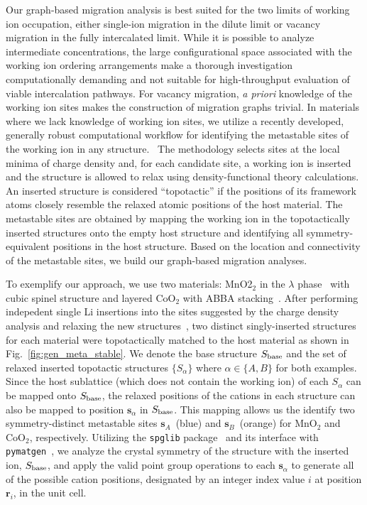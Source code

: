 \documentclass[reprint,preprintnumbers,amsmath,amssymb,aps,prl]{revtex4-1}
\begin{document}
Our graph-based migration analysis is best suited for the two limits of working ion occupation, either single-ion migration in the dilute limit or vacancy migration in the fully intercalated limit.
While it is possible to analyze intermediate concentrations, the large configurational space associated with the working ion ordering arrangements make a thorough investigation computationally demanding and not suitable for high-throughput evaluation of viable intercalation pathways.
For vacancy migration, {\it a priori} knowledge of the working ion sites makes the construction of migration graphs trivial.
In materials where we lack knowledge of working ion sites, we utilize a recently developed, generally robust computational workflow for identifying the metastable sites of the working ion in any structure.~\cite{Shen2020Oct} 
The methodology selects sites at the local minima of charge density and, for each candidate site, a working ion is inserted and the structure is allowed to relax using density-functional theory calculations. An inserted structure is considered ``topotactic'' if the positions of its framework atoms closely resemble the relaxed atomic positions of the host material.
The metastable sites are obtained by mapping the working ion in the topotactically inserted structures onto the empty host structure and identifying all symmetry-equivalent positions in the host structure. Based on the location and connectivity of the metastable sites, we build our graph-based migration analyses. 

To exemplify our approach, we use two materials: MnO2$_2$ in the $\lambda$ phase~\cite{Juran2018Apr} with cubic spinel structure and layered CoO$_2$ with ABBA stacking~\cite{Laubach2009Apr}.
After performing indepedent single Li insertions into the sites suggested by the charge density analysis and relaxing the new structures~\cite{Shen2020Oct}, two distinct singly-inserted structures for each material were topotactically matched to the host material as shown in Fig.~\ref{fig:gen_meta_stable}.
We denote the base structure $S_{\rm base}$ and the set of relaxed inserted topotactic structures $\{S_{\alpha}\}$ where $\alpha \in \{A, B\}$ for both examples.
Since the host sublattice (which does not contain the working ion) of each $S_\alpha$ can be mapped onto $S_{\rm base}$, the relaxed positions of the cations in each structure can also be mapped to position $\mathbf{s}_\alpha$ in $S_{\rm base}$.
This mapping allows us the identify two symmetry-distinct metastable sites $\mathbf{s}_A$~(blue) and $\mathbf{s}_B$~(orange) for MnO$_2$ and CoO$_2$, respectively. Utilizing the \texttt{spglib} package~\cite{Togo2018Aug} and its interface with \texttt{pymatgen}~\cite{Ong2015Feb}, we analyze the crystal symmetry of the structure with the inserted ion, $S_{\rm base}$, and apply the valid point group operations to each $\mathbf{s}_\alpha$ to generate all of the possible cation positions, designated by an integer index value $i$ at position $\mathbf{r}_i$, in the unit cell.
\end{document}
